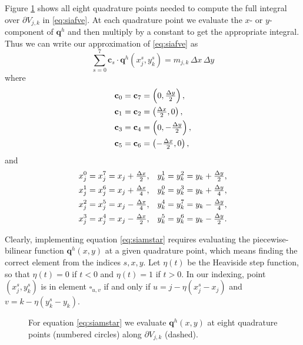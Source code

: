 \documentclass[twocolumn,letterpaper]{igs}
\newcommand\bc{\mathbf{c}}
\newcommand\bq{\mathbf{q}}
\begin{document}
Figure \ref{fig:improvequadrature} shows all eight quadrature points needed to compute the full integral over $\partial V_{j,k}$ in \eqref{eq:siafve}.  At each quadrature point we evaluate the $x$- or $y$-component of $\bq^h$ and then multiply by a constant to get the appropriate integral.  Thus we can write our approximation of \eqref{eq:siafve} as
\begin{equation}
\sum_{s=0}^7 \bc_s \cdot \bq^h(x_j^s,y_k^s) = m_{j,k}\,\Delta x\,\Delta y  \label{eq:siamstar}
\end{equation}
where
\begin{align}
\bc_0 &= \bc_7 = \left(0, \tfrac{\Delta y}{2}\right),  \label{eq:cs} \\
\bc_1 &= \bc_2 = \left(\tfrac{\Delta x}{2},0\right),  \notag \\
\bc_3 &= \bc_4 = \left(0, -\tfrac{\Delta y}{2}\right),  \notag \\
\bc_5 &= \bc_6 = \left(-\tfrac{\Delta x}{2},0\right),  \notag
\end{align}
and
\begin{align}
x_j^0 &= x_j^7 = x_j + \tfrac{\Delta x}{2}, & y_k^1 &= y_k^2 = y_k + \tfrac{\Delta y}{2}, \label{eq:xjsyks} \\
x_j^1 &= x_j^6 = x_j + \tfrac{\Delta x}{4}, & y_k^0 &= y_k^3 = y_k + \tfrac{\Delta y}{4}, \notag \\
x_j^2 &= x_j^5 = x_j - \tfrac{\Delta x}{4}, & y_k^4 &= y_k^7 = y_k - \tfrac{\Delta y}{4}, \notag \\
x_j^3 &= x_j^4 = x_j - \tfrac{\Delta x}{2}, & y_k^5 &= y_k^6 = y_k - \tfrac{\Delta y}{2}. \notag
\end{align}

Clearly, implementing equation \eqref{eq:siamstar} requires evaluating the piecewise-bilinear function $\bq^h(x,y)$ at a given quadrature point, which means finding the correct element from the indices $s,x,y$.  Let $\eta(t)$ be the Heaviside step function, so that $\eta(t)=0$ if $t<0$ and $\eta(t)=1$ if $t>0$.  In our indexing, point $(x_j^s,y_k^s)$ is in element $\square_{u,v}$ if and only if $u = j-\eta(x_j^s-x_j)$ and $v=k-\eta(y_k^s-y_k)$.

\begin{figure}[ht]
\begin{center}

\end{center}
\caption{For equation \eqref{eq:siamstar} we evaluate $\bq^h(x,y)$ at eight quadrature points (numbered circles) along $\partial V_{j,k}$ (dashed).}
\label{fig:improvequadrature}
\end{figure}
\end{document}
